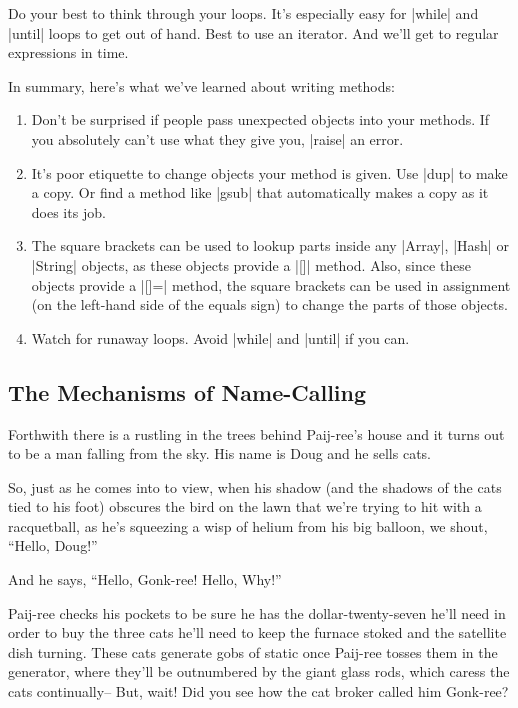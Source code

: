 \documentclass[12pt,twoside]{report}
\begin{document}
Do your best to think through your loops.  It's especially easy for
\rubyinline|while| and
\rubyinline|until| loops to get out of hand.  Best to
use an iterator.  And we'll get to regular expressions in time.

In summary, here's what we've learned about writing methods:

\begin{enumerate}
\item Don't be surprised if people pass unexpected objects into your
  methods. If you absolutely can't use what they give you,
  \rubyinline|raise| an error.
\item It's poor etiquette to change objects your method is given.  Use
  \rubyinline|dup| to make a copy.  Or find a method
  like \rubyinline|gsub| that automatically makes a
  copy as it does its job.
\item The square brackets can be used to lookup parts inside any
  \rubyinline|Array|,
  \rubyinline|Hash| or
  \rubyinline|String| objects, as these objects
  provide a \rubyinline|[]| method.  Also, since these
  objects provide a \rubyinline|[]=| method, the
  square brackets can be used in assignment (on the left-hand side of
  the equals sign) to change the parts of those objects.
\item Watch for runaway loops.  Avoid
  \rubyinline|while| and
  \rubyinline|until| if you can.
\end{enumerate}

\newpage



\subsection{The Mechanisms of Name-Calling}




Forthwith there is a rustling in the trees behind Paij-ree's house and
it turns out to be a man falling from the sky.  His name is Doug and
he sells cats.

So, just as he comes into to view, when his shadow (and the shadows of
the cats tied to his foot) obscures the bird on the lawn that we're
trying to hit with a racquetball, as he's squeezing a wisp of helium
from his big balloon, we shout, ``Hello, Doug!''

And he says, ``Hello, Gonk-ree!  Hello, Why!''

Paij-ree checks his pockets to be sure he has the dollar-twenty-seven
he'll need in order to buy the three cats he'll need to keep the
furnace stoked and the satellite dish turning.  These cats generate
gobs of static once Paij-ree tosses them in the generator, where
they'll be outnumbered by the giant glass rods, which caress the cats
continually-- But, wait!  Did you see how the cat broker called him
Gonk-ree?
\end{document}
